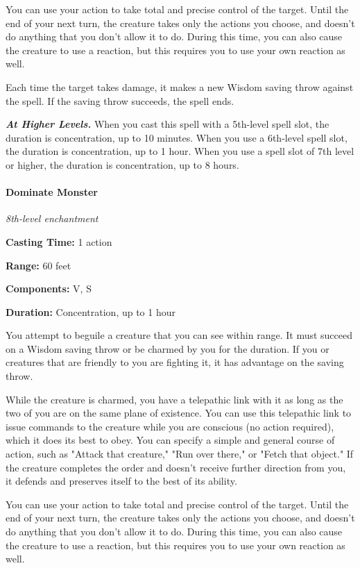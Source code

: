 \documentclass[
]{article}
\begin{document}
You can use your action to take total and precise control of the target.
Until the end of your next turn, the creature takes only the actions you
choose, and doesn't do anything that you don't allow it to do. During
this time, you can also cause the creature to use a reaction, but this
requires you to use your own reaction as well.

Each time the target takes damage, it makes a new Wisdom saving throw
against the spell. If the saving throw succeeds, the spell ends.

\emph{\textbf{At Higher Levels.}} When you cast this spell with a
5th-level spell slot, the duration is concentration, up to 10 minutes.
When you use a 6th-level spell slot, the duration is concentration, up
to 1 hour. When you use a spell slot of 7th level or higher, the
duration is concentration, up to 8 hours.

\hypertarget{dominate-monster}{%
\paragraph{Dominate Monster}\label{dominate-monster}}

\emph{8th-level enchantment}

\textbf{Casting Time:} 1 action

\textbf{Range:} 60 feet

\textbf{Components:} V, S

\textbf{Duration:} Concentration, up to 1 hour

You attempt to beguile a creature that you can see within range. It must
succeed on a Wisdom saving throw or be charmed by you for the duration.
If you or creatures that are friendly to you are fighting it, it has
advantage on the saving throw.

While the creature is charmed, you have a telepathic link with it as
long as the two of you are on the same plane of existence. You can use
this telepathic link to issue commands to the creature while you are
conscious (no action required), which it does its best to obey. You can
specify a simple and general course of action, such as "Attack that
creature," "Run over there," or "Fetch that object." If the creature
completes the order and doesn't receive further direction from you, it
defends and preserves itself to the best of its ability.

You can use your action to take total and precise control of the target.
Until the end of your next turn, the creature takes only the actions you
choose, and doesn't do anything that you don't allow it to do. During
this time, you can also cause the creature to use a reaction, but this
requires you to use your own reaction as well.
\end{document}
